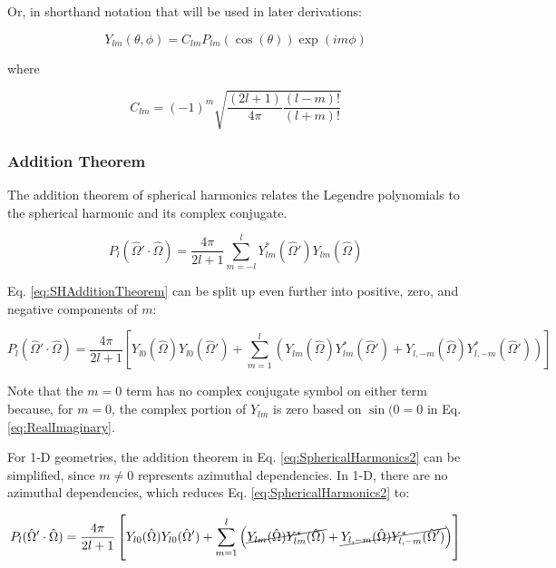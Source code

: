 \documentclass[10pt]{article}
\begin{document}
\begin{flushleft}
Or, in shorthand notation that will be used in later derivations:

\begin{equation}
\label{eq:SphericaltoAssociatedShort}
Y_{lm}(\theta,\phi)=C_{lm}P_{lm}(\cos{(\theta)})\exp{(im\phi)}
\end{equation}

where

\begin{equation}
\label{eq:Clm}
C_{lm}=(-1)^m\sqrt{\frac{(2l+1)}{4\pi}\frac{(l-m)!}{(l+m)!}}
\end{equation}



\subsubsection{Addition Theorem}
The addition theorem of spherical harmonics relates the Legendre polynomials to the spherical harmonic and its complex conjugate. 

\begin{equation}
\label{eq:SHAdditionTheorem}
P_l(\hat{\Omega}'\cdot\hat{\Omega}) = \frac{4\pi}{2l+1} \sum_{m=-l}^{l} Y_{lm}^{*} (\hat{\Omega}') Y_{lm}(\hat{\Omega})
\end{equation}

Eq. \eqref{eq:SHAdditionTheorem} can be split up even further into positive, zero, and negative components of \(m\):

\begin{equation}
\label{eq:SphericalHarmonics2}
P_l(\hat{\Omega}'\cdot\hat{\Omega})=\frac{4\pi}{2l+1}\left\lbrack Y_{l0}(\hat{\Omega})Y_{l0}(\hat{\Omega}')+\sum_{m=1}^{l}\left(Y_{lm}(\hat{\Omega})Y_{lm}^*(\hat{\Omega}')+Y_{l,-m}(\hat{\Omega})Y_{l,-m}^*(\hat{\Omega}')\right)\right\rbrack
\end{equation}

Note that the \(m=0\) term has no complex conjugate symbol on either term because, for \(m=0\), the complex portion of \(Y_{lm}\) is zero based on \(\sin{(0}=0\) in Eq. \eqref{eq:RealImaginary}. 



\begin{tcolorbox}[breakable]
For 1-D geometries, the addition theorem in Eq. \eqref{eq:SphericalHarmonics2} can be simplified, since \(m\neq0\) represents azimuthal dependencies. In 1-D, there are no azimuthal dependencies, which reduces Eq. \eqref{eq:SphericalHarmonics2} to:

\begin{equation}
\label{eq:SphericalHarmonics3}
P_l(\hat{\Omega}'\cdot\hat{\Omega})=\frac{4\pi}{2l+1}\left\lbrack Y_{l0}(\hat{\Omega})Y_{l0}(\hat{\Omega}')+\sum_{m=1}^{l}\left(\cancel{Y_{lm}(\hat{\Omega})Y_{lm}^*(\hat{\Omega})}+\cancel{Y_{l,-m}(\hat{\Omega})Y_{l,-m}^*(\hat{\Omega}')}\right)\right\rbrack
\end{equation}


\end{tcolorbox}
\end{flushleft}
\end{document}
